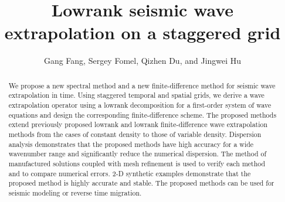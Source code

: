 \title{Lowrank seismic wave extrapolation on a staggered grid}
\author{Gang Fang\footnotemark[1], Sergey Fomel\footnotemark[2], Qizhen Du\footnotemark[3], and Jingwei Hu\footnotemark[4]}

\address{
\footnotemark[1]School of Geosciences\\
China University of Petroleum (East China)\\
Qingdao, Shandong 266580, China \\ 
fangg.geo@gmail.com; gangfang@utexas.edu\\
\footnotemark[2]Bureau of Economic Geology, \\
John A. and Katherine G. Jackson School of Geosciences \\
The University of Texas at Austin \\
University Station, Box X \\
Austin, TX 78713-8972, USA \\
sergey.fomel@beg.utexas.edu \\
\footnotemark[3]School of Geosciences\\
China University of Petroleum (East China)\\
Qingdao, Shandong  266580, China \\ 
multicomponent@163.com; duqizhen@upc.edu.cn\\
\footnotemark[4]Institute for Computational Engineering and Sciences (ICES)\\
The University of Texas at Austin\\
201 East 24th St, Stop C0200, Austin, TX 78712, USA\\
hu@ices.utexas.edu\\
}



\maketitle

\begin{abstract}
We propose a new spectral method and a new finite-difference method for seismic wave extrapolation in time. Using staggered temporal and spatial grids, we derive a wave extrapolation operator using a lowrank decomposition for a first-order system of wave equations and design the corresponding finite-difference scheme. The proposed methods extend previously proposed lowrank and lowrank finite-difference wave extrapolation methods from the cases of constant density to those of variable density. Dispersion analysis demonstrates that the proposed methods have high accuracy for a wide wavenumber range and significantly reduce the numerical dispersion. The method of manufactured solutions coupled with mesh refinement is used to verify each method and to compare numerical errors. 2-D synthetic examples demonstrate that the proposed method is highly accurate and stable. The proposed methods can be used for seismic modeling or reverse time migration.
\end{abstract}


